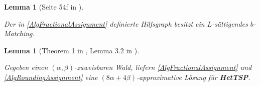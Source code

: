 \documentclass[a4paper,ngerman,12pt,bibtotoc]{scrartcl}
\theoremstyle{definition}
\theoremstyle{plain}
\newtheorem{lemma}[defn]{Lemma}
\theoremstyle{remark}
\newcommand{\HetTSP}{\textbf{HetTSP}}
\begin{document}
\begin{minipage}{0.45\textwidth}
		\begin{lemma}[Seite 54f in \cite{bMatching}]~
			
			Der in \cref{AlgFractionalAssignment} definierte Hilfsgraph besitzt ein $L$-sättigendes $b$-Matching.
		\end{lemma}

		\begin{lemma}[Theorem 1 in \cite{Rounding}, Lemma 3.2 in \cite{HetCVRP}]~
			
			Gegeben einen $(\alpha, \beta)$-zuweisbaren Wald, liefern \cref{AlgFractionalAssignment} und \cref{AlgRoundingAssignment} eine $(8\alpha+4\beta)$-approximative Lösung für \HetTSP.
		\end{lemma}
	\end{minipage}
	
\end{document}

